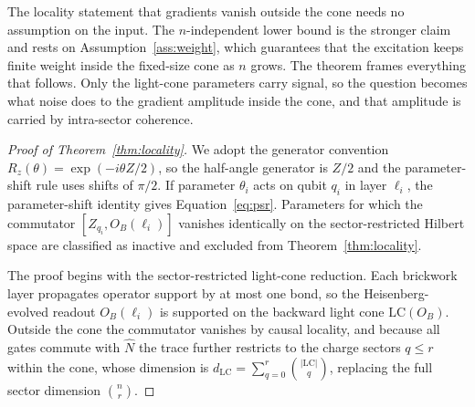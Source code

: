 \documentclass[10pt,a4paper]{amsart}
\newcommand{\LC}{\mathrm{LC}}
\begin{document}
The locality statement that gradients vanish outside the cone needs no assumption on the input. The $n$-independent lower bound is the stronger claim and rests on Assumption~\ref{ass:weight}, which guarantees that the excitation keeps finite weight inside the fixed-size cone as $n$ grows. The theorem frames everything that follows. Only the light-cone parameters carry signal, so the question becomes what noise does to the gradient amplitude inside the cone, and that amplitude is carried by intra-sector coherence.

\begin{proof}[Proof of Theorem~\ref{thm:locality}]
We adopt the generator convention $R_z(\theta)=\exp(-i\theta Z/2)$, so the half-angle generator is $Z/2$ and the parameter-shift rule uses shifts of $\pi/2$. If parameter $\theta_i$ acts on qubit $q_i$ in layer $\ell_i$, the parameter-shift identity gives Equation~\eqref{eq:psr}. Parameters for which the commutator $[Z_{q_i},O_B(\ell_i)]$ vanishes identically on the sector-restricted Hilbert space are classified as inactive and excluded from Theorem~\ref{thm:locality}.

The proof begins with the sector-restricted light-cone reduction. Each brickwork layer propagates operator support by at most one bond, so the Heisenberg-evolved readout $O_B(\ell_i)$ is supported on the backward light cone $\LC(O_B)$. Outside the cone the commutator vanishes by causal locality, and because all gates commute with $\hat N$ the trace further restricts to the charge sectors $q\leq r$ within the cone, whose dimension is $d_{\LC}=\sum_{q=0}^{r}\binom{|\LC|}{q}$, replacing the full sector dimension $\binom{n}{r}$.


\end{proof}
\end{document}
